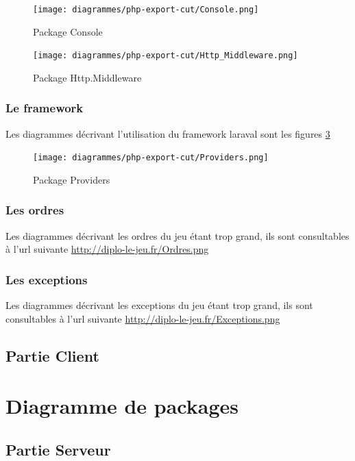 			\begin{figure}[!h]
				\centering
                \texttt{[image: diagrammes/php-export-cut/Console.png]}
                \caption{\label{pconsole}Package Console}
			\end{figure}

			\begin{figure}[!h]
				\centering
                \texttt{[image: diagrammes/php-export-cut/Http\_Middleware.png]}
                \caption{\label{phmiddleware}Package Http.Middleware}
			\end{figure}

        \newpage
        \subsubsection{Le framework}
        Les diagrammes décrivant l'utilisation du framework laraval sont les figures \ref{pproviders}
			\begin{figure}[!h]
				\centering
                \texttt{[image: diagrammes/php-export-cut/Providers.png]}
                \caption{\label{pproviders}Package Providers}
			\end{figure}
        \newpage

        \newpage
		\subsubsection{Les ordres}
        Les diagrammes décrivant les ordres du jeu étant trop grand, ils sont consultables à l'url suivante \url{http://diplo-le-jeu.fr/Ordres.png}

        \newpage
		\subsubsection{Les exceptions}
        Les diagrammes décrivant les exceptions du jeu étant trop grand, ils sont consultables à l'url suivante \url{http://diplo-le-jeu.fr/Exceptions.png}

        
    \pagebreak
	\subsection{Partie Client}

    \newpage
\section{Diagramme de packages}
	\subsection{Partie Serveur}
